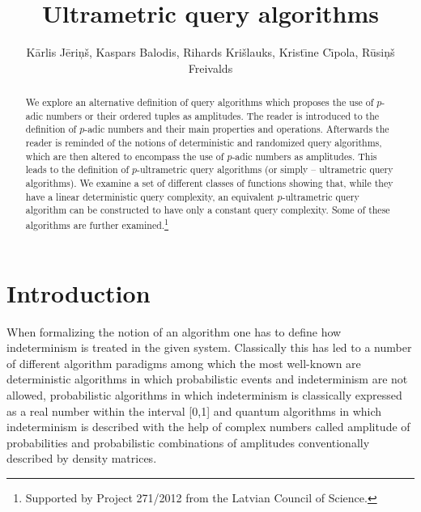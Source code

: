 \documentclass{llncs}
\begin{document}
\title{Ultrametric query algorithms}


\author{
K\= arlis J\= eri\c n\v s,
Kaspars Balodis,
Rihards Kri\v slauks,
Krist\= \i ne C\= \i pola,
R\= usi\c n\v s Freivalds}



\maketitle

\begin{abstract} 
We explore an alternative definition of query algorithms which proposes the use of $p$-adic numbers or their ordered tuples as amplitudes. The reader is introduced to the definition of $p$-adic numbers and their main properties and operations. Afterwards the reader is reminded of the notions of deterministic and randomized query algorithms, which are then altered to encompass the use of $p$-adic numbers as amplitudes. This leads to the definition of $p$-ultrametric query algorithms (or simply – ultrametric query algorithms). We examine a set of different classes of functions showing that, while they have a linear deterministic query complexity, an equivalent $p$-ultrametric query algorithm can be constructed to have only a constant query complexity. Some of these algorithms are further examined.\footnote{Supported by Project 271/2012 from the Latvian Council of Science.}
\end{abstract} 

\section{Introduction}
When formalizing the notion of an algorithm one has to define how indeterminism is treated in the given system. Classically this has led to a number of different algorithm paradigms among which the most well-known are deterministic algorithms in which probabilistic events and indeterminism are not allowed, probabilistic algorithms in which indeterminism is classically expressed as a real number within the interval [0,1] and quantum algorithms in which indeterminism is described with the help of complex numbers called amplitude of probabilities and probabilistic combinations of amplitudes conventionally described by density matrices.
\end{document}
